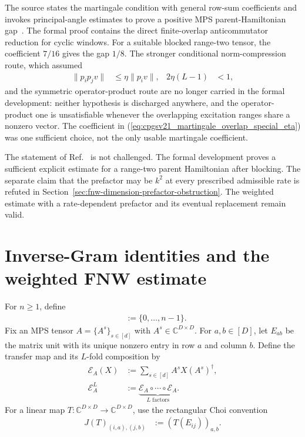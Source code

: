 \documentclass{article}
\begin{document}
The source states the martingale condition with general row-sum coefficients
and invokes principal-angle estimates to prove a positive MPS
parent-Hamiltonian gap~\cite[Section~IV.C]{Cirac2021Matrix}. The formal proof
contains the direct finite-overlap anticommutator reduction for cyclic windows.
For a suitable blocked range-two tensor, the coefficient $7/16$ gives the gap
$1/8$. The stronger conditional norm-compression route, which assumed
\begin{align}
    \lVert p_ip_jv\rVert
               & \leq\eta\lVert p_iv\rVert,
               &
    2\eta(L-1) & <1,
    \label{eq:cpgsv21_martingale_overlap_conclusion_compression}
\end{align}
and the symmetric operator-product route are no longer carried in the formal
development: neither hypothesis is discharged anywhere, and the
operator-product one is unsatisfiable whenever the overlapping excitation
ranges share a nonzero vector. The coefficient in
(\ref{eq:cpgsv21_martingale_overlap_special_eta}) was one sufficient choice,
not the only usable martingale coefficient.

The statement of Ref.~\cite{Cirac2021Matrix} is not challenged. The formal
development proves a sufficient explicit estimate for a range-two parent
Hamiltonian after blocking. The separate claim that the prefactor may be
$k^2$ at every prescribed admissible rate is refuted in
Section~\ref{sec:fnw-dimension-prefactor-obstruction}. The weighted estimate
with a rate-dependent prefactor and its eventual replacement remain valid.

\section{Inverse-Gram identities and the weighted FNW estimate}

For $n\geq1$, define
\begin{align}
    [n]
     & :=\{0,\ldots,n-1\}.
    \label{eq:cpgsv21_martingale_overlap_finite_index_notation}
\end{align}
Fix an MPS tensor $A=\{A^s\}_{s\in[d]}$ with
$A^s\in\mathbb C^{D\times D}$. For $a,b\in[D]$, let $E_{ab}$ be the matrix
unit with its unique nonzero entry in row $a$ and column $b$. Define the
transfer map and its $L$-fold composition by
\begin{align}
    \mathcal E_A(X)
     & :=\sum_{s\in[d]}A^sX(A^s)^\dagger,
    \label{eq:cpgsv21_martingale_overlap_transfer_map}         \\
    \mathcal E_A^L
     & :=\underbrace{\mathcal E_A\circ\cdots\circ\mathcal E_A}
    _{L\text{ factors}}.
    \label{eq:cpgsv21_martingale_overlap_transfer_power}
\end{align}
For a linear map
$T\colon\mathbb C^{D\times D}\to\mathbb C^{D\times D}$, use the rectangular
Choi convention
\begin{align}
    J(T)_{(i,a),(j,b)}
     & :=(T(E_{ij}))_{a,b}.
    \label{eq:cpgsv21_martingale_overlap_rectangular_choi}
\end{align}
\end{document}
